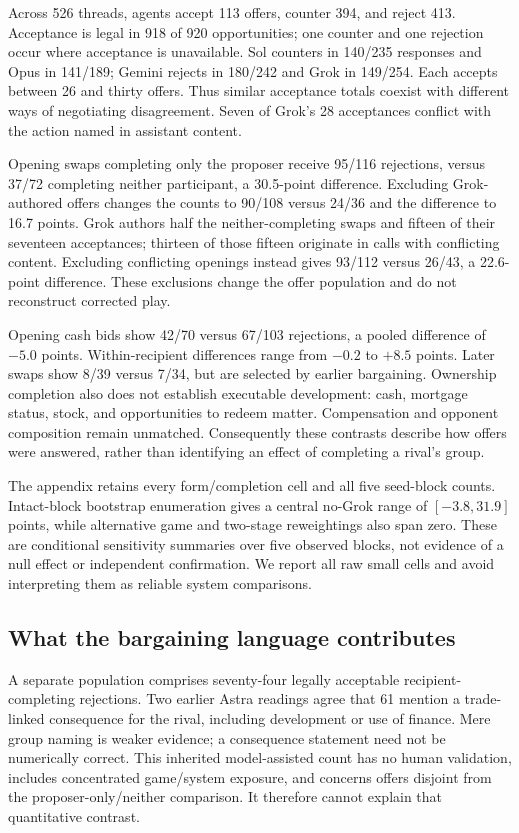 Across 526 threads, agents accept 113 offers, counter 394, and reject 413. Acceptance is legal in 918 of 920 opportunities; one counter and one rejection occur where acceptance is unavailable. Sol counters in 140/235 responses and Opus in 141/189; Gemini rejects in 180/242 and Grok in 149/254. Each accepts between 26 and thirty offers. Thus similar acceptance totals coexist with different ways of negotiating disagreement. Seven of Grok's 28 acceptances conflict with the action named in assistant content.

Opening swaps completing only the proposer receive 95/116 rejections, versus 37/72 completing neither participant, a 30.5-point difference. Excluding Grok-authored offers changes the counts to 90/108 versus 24/36 and the difference to 16.7 points. Grok authors half the neither-completing swaps and fifteen of their seventeen acceptances; thirteen of those fifteen originate in calls with conflicting content. Excluding conflicting openings instead gives 93/112 versus 26/43, a 22.6-point difference. These exclusions change the offer population and do not reconstruct corrected play.

Opening cash bids show 42/70 versus 67/103 rejections, a pooled difference of $-5.0$ points. Within-recipient differences range from $-0.2$ to $+8.5$ points. Later swaps show 8/39 versus 7/34, but are selected by earlier bargaining. Ownership completion also does not establish executable development: cash, mortgage status, stock, and opportunities to redeem matter. Compensation and opponent composition remain unmatched. Consequently these contrasts describe how offers were answered, rather than identifying an effect of completing a rival's group.

The appendix retains every form/completion cell and all five seed-block counts. Intact-block bootstrap enumeration gives a central no-Grok range of $[-3.8,31.9]$ points, while alternative game and two-stage reweightings also span zero. These are conditional sensitivity summaries over five observed blocks, not evidence of a null effect or independent confirmation. We report all raw small cells and avoid interpreting them as reliable system comparisons.

\subsection{What the bargaining language contributes}

A separate population comprises seventy-four legally acceptable recipient-completing rejections. Two earlier Astra readings agree that 61 mention a trade-linked consequence for the rival, including development or use of finance. Mere group naming is weaker evidence; a consequence statement need not be numerically correct. This inherited model-assisted count has no human validation, includes concentrated game/system exposure, and concerns offers disjoint from the proposer-only/neither comparison. It therefore cannot explain that quantitative contrast.

